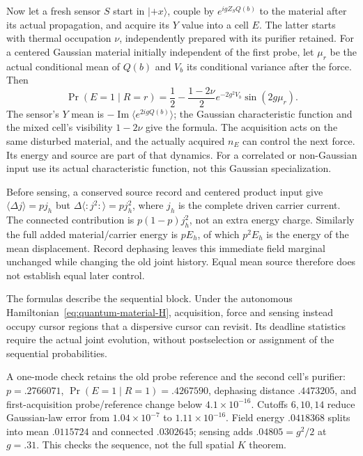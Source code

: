 Now let a fresh sensor $S$ start in $|+x\rangle$, couple by
$e^{igZ_SQ(b)}$ to the material after its actual propagation, and
acquire its $Y$ value into a cell $E$. The latter starts with thermal
occupation $\nu$, independently prepared with its purifier retained.
For a centered Gaussian material initially independent of the first
probe, let $\mu_r$ be the actual conditional mean of $Q(b)$ and
$V_b$ its conditional variance after the force. Then
\begin{equation}
 \Pr(E=1\mid R=r)=\frac12-\frac{1-2\nu}{2}
                  e^{-2g^2V_b}\sin(2g\mu_r).
 \label{eq:quantum-second-record}
\end{equation}
The sensor's $Y$ mean is
$-\operatorname{Im}\langle e^{2igQ(b)}\rangle$; the Gaussian
characteristic function and the mixed cell's visibility $1-2\nu$
give the formula. The acquisition acts on the same disturbed material,
and the actually acquired $n_E$ can control the next force.
Its energy and source are part of that dynamics.
For a correlated or non-Gaussian input use its actual characteristic
function, not this Gaussian specialization.

Before sensing, a conserved source record and centered product input
give $\langle\Delta j\rangle=pj_h$ but
$\Delta\langle:j^2:\rangle=pj_h^2$, where $j_h$ is the complete
driven carrier current. The connected contribution is
$p(1-p)j_h^2$, not an extra energy charge.
Similarly the full added material/carrier energy is $pE_h$,
of which $p^2E_h$ is the energy of the mean displacement.
Record dephasing leaves this immediate field marginal unchanged while
changing the old joint history. Equal mean source therefore does not
establish equal later control.

The formulas describe the sequential block. Under the autonomous
Hamiltonian~\eqref{eq:quantum-material-H}, acquisition, force and
sensing instead occupy cursor regions that a dispersive cursor can
revisit. Its deadline statistics require the actual joint evolution,
without postselection or assignment of the sequential probabilities.

A one-mode check retains the old probe reference and the second cell's
purifier: $p=.2766071$, $\Pr(E=1\mid R=1)=.4267590$, dephasing
distance $.4473205$, and first-acquisition probe/reference change
below $4.1\times10^{-16}$. Cutoffs $6,10,14$ reduce Gaussian-law
error from $1.04\times10^{-7}$ to $1.11\times10^{-16}$.
Field energy $.0418368$ splits into mean $.0115724$ and connected
$.0302645$; sensing adds $.04805=g^2/2$ at $g=.31$.
This checks the sequence, not the full spatial $K$ theorem.


